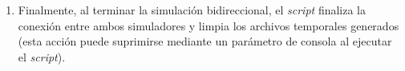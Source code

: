 \begin{enumerate}
    \item Finalmente, al terminar la simulación bidireccional, el \emph{script} finaliza la conexión entre ambos simuladores y limpia los archivos temporales generados (esta acción puede suprimirse mediante un parámetro de consola al ejecutar el \emph{script}).
    
\end{enumerate}
